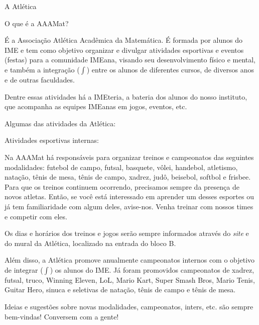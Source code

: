 \begin{secao}{A Atlética} %

\begin{subsecao}{O que é a AAAMat?}

É a Associação Atlética Acadêmica da Matemática. É formada por alunos do IME e
tem como objetivo organizar e divulgar atividades esportivas e eventos (festas)
para a comunidade IMEana, visando seu desenvolvimento físico e mental,
e também a integração ($\int$) entre os alunos de diferentes cursos, de diversos
anos e de outras faculdades.

Dentre essas atividades há a IMEteria, a bateria dos alunos do nosso instituto,
que acompanha as equipes IMEanas em jogos, eventos, etc.

\end{subsecao}

Algumas das atividades da Atlética:

\begin{subsecao}{Atividades esportivas internas:}

Na AAAMat há responsáveis para organizar treinos e campeonatos das seguintes
modalidades: futebol de campo, futsal, basquete, vôlei, handebol, atletismo,
natação, tênis de mesa, tênis de campo, xadrez, judô, beisebol, softbol e
frisbee. Para que os treinos continuem ocorrendo, precisamos sempre da presença
de novos atletas. Então, se você está interessado em aprender um desses esportes
ou já tem familiaridade com algum deles, avise-nos. Venha treinar com nossos
times e competir com eles.

Os dias e horários dos treinos e jogos serão sempre informados através do \textit{site}
e do mural da Atlética, localizado na entrada do bloco B.

Além disso, a Atlética promove anualmente campeonatos internos com o objetivo de
integrar ($\int$) os alunos do IME. Já foram promovidos campeonatos de xadrez,
futsal, truco, Winning Eleven, LoL, Mario Kart, Super Smash Bros, Mario Tenis,
Guitar Hero, sinuca e seletivas de natação, tênis de campo e tênis de mesa.

Ideias e sugestões sobre novas modalidades, campeonatos, inters, etc. são sempre
 bem-vindas! Conversem com a gente!

\end{subsecao}


\end{secao}
